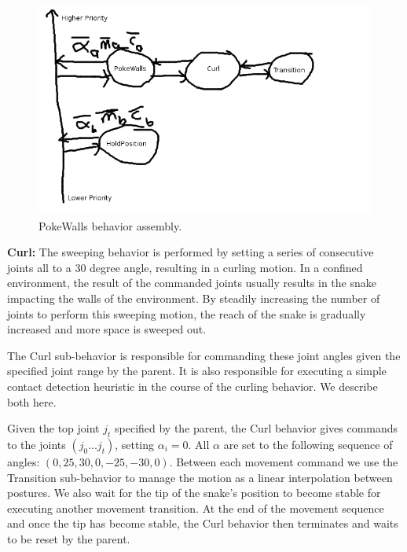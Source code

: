 \begin{figure}
\begin{center}
\includegraphics[scale=0.5]{4_pokewalls_1.png}
\end{center}
\caption{PokeWalls behavior assembly.}
\label{pokewalls1}
\end{figure}




\textbf{Curl:} The sweeping behavior is performed by setting a series of consecutive joints all to a 30 degree angle, resulting in a curling motion.  In a confined environment, the result of the commanded joints usually results in the snake impacting the walls of the environment.  By steadily increasing the number of joints to perform this sweeping motion, the reach of the snake is gradually increased and more space is sweeped out.

The Curl sub-behavior is responsible for commanding these joint angles given the specified joint range by the parent.  It is also responsible for executing a simple contact detection heuristic in the course of the curling behavior.  We describe both here.  

Given the top joint $j_t$ specified by the parent, the Curl behavior gives commands to the joints $(j_0 ... j_t)$, setting $\alpha_i = 0$.  All $\alpha$ are set to the following sequence of angles: $(0, 25, 30, 0, -25, -30, 0)$.  Between each movement command we use the Transition sub-behavior to manage the motion as a linear interpolation between postures.  We also wait for the tip of the snake's position to become stable for executing another movement transition.  At the end of the movement sequence and once the tip has become stable, the Curl behavior then terminates and waits to be reset by the parent. 

